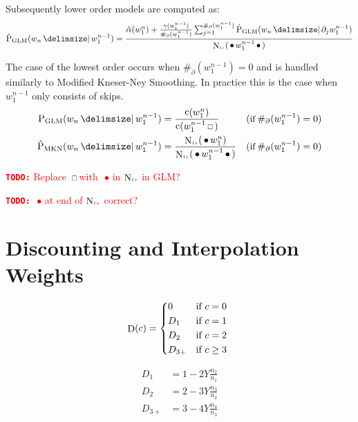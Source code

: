 \documentclass[11pt,a4paper]{report}
\newcommand*{\Scale}[2][4]{\scalebox{#1}{$#2$}}%
\DeclareMathOperator{\Count}{c}
\DeclareMathOperator{\ContCount}{N}
\newcommand{\ContCountIp}  {\ContCount_{\Scale[0.5]{1+}}}
\DeclareMathOperator{\Discount}{D}
\newcommand{\Skp}{\ensuremath{\,\Scale[0.7]{\square}\,}}
\newcommand{\WSkp}{\ensuremath{\,\bullet\,}}
\newcommand{\todo}[1]{\textcolor{red}{{\footnotesize\textbf{\texttt{TODO:}}} #1}}
\begin{document}
Subsequently lower order models are computed as:
\begin{equation}
  \ProbGLM*{w_n}{w_1^{n-1}} =
    \frac{\hat\alpha(w_1^n) + \frac{\gamma(w_1^{n-1})}{\#_\partial(w_1^{n-1})}
                              \sum_{j=1}^{\#_\partial(w_1^{n-1})} \ProbGLM*{w_n}{\partial_j w_1^{n-1}}}
         {\ContCountIp(\WSkp w_1^{n-1} \WSkp)}
\end{equation}

The case of the lowest order occurs when $\#_\partial(w_1^{n-1}) = 0$ and is
handled similarly to Modified Kneser-Ney Smoothing.
In practice this is the case when $w_1^{n-1}$ only consists of skips.
\begin{subequations}
  \begin{align}
    \ProbGLM {w_n}{w_1^{n-1}} &= \frac{\Count(w_1^n)}{\Count(w_1^{n-1} \Skp)}
      & \small{(\text{if} \: \#_\partial(w_1^{n-1}) = 0)} \\
    \ProbMKN*{w_n}{w_1^{n-1}} &= \frac{\ContCountIp(\WSkp w_1^n)}{\ContCountIp(\WSkp w_1^{n-1} \WSkp)}
      & \small{(\text{if} \: \#_\partial(w_1^{n-1}) = 0)}
  \end{align}
\end{subequations}

\todo{Replace \Skp with \WSkp in $\ContCountIp$ in GLM?}

\todo{\WSkp at end of $\ContCountIp$ correct?}

\section{Discounting and Interpolation Weights}
\label{sec:discounts-interpolation-weights}

\begin{equation}
  \Discount(c) =
    \begin{dcases*}
      0      & if $c = 0$ \\
      D_1    & if $c = 1$ \\
      D_2    & if $c = 2$ \\
      D_{3+} & if $c \geq 3$ \\
    \end{dcases*}
\end{equation}

\begin{subequations}
  \begin{align}
    D_1    &= 1 - 2 Y \frac{n_2}{n_1} \\
    D_2    &= 2 - 3 Y \frac{n_3}{n_2} \\
    D_{3+} &= 3 - 4 Y \frac{n_4}{n_3}
  \end{align}
\end{subequations}
\end{document}
